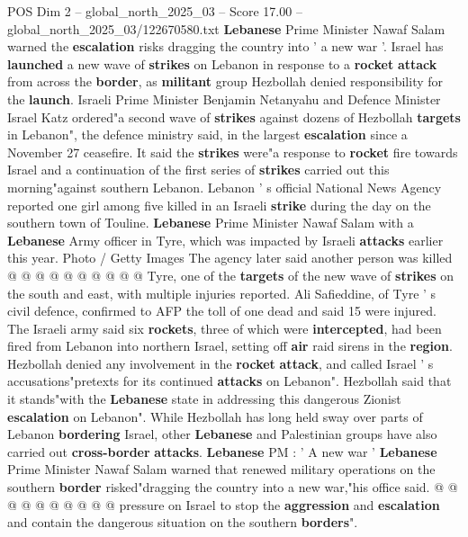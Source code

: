 \begin{textsample}{POS Dim 2 – global\_north\_2025\_03 – Score 17.00 – global\_north\_2025\_03/122670580.txt}  \label{ex:f2_pos_417}
\textbf{Lebanese} Prime Minister Nawaf Salam warned the \textbf{escalation} risks dragging the country into ' a new war '.
Israel has \textbf{launched} a new wave of \textbf{strikes} on Lebanon in response to a \textbf{rocket} \textbf{attack} from across the \textbf{border}, as \textbf{militant} group Hezbollah denied responsibility for the \textbf{launch}.
Israeli Prime Minister Benjamin Netanyahu and Defence Minister Israel Katz ordered"a second wave of \textbf{strikes} against dozens of Hezbollah \textbf{targets} in Lebanon", the defence ministry said, in the largest \textbf{escalation} since a November 27 ceasefire.
It said the \textbf{strikes} were"a response to \textbf{rocket} fire towards Israel and a continuation of the first series of \textbf{strikes} carried out this morning"against southern Lebanon.
Lebanon ' s official National News Agency reported one girl among five killed in an Israeli \textbf{strike} during the day on the southern town of Touline. \textbf{Lebanese} Prime Minister Nawaf Salam with a \textbf{Lebanese} Army officer in Tyre, which was impacted by Israeli \textbf{attacks} earlier this year.
Photo / Getty Images The agency later said another person was killed @ @ @ @ @ @ @ @ @ @ Tyre, one of the \textbf{targets} of the new wave of \textbf{strikes} on the south and east, with multiple injuries reported.
Ali Safieddine, of Tyre ' s civil defence, confirmed to AFP the toll of one dead and said 15 were injured.
The Israeli army said six \textbf{rockets}, three of which were \textbf{intercepted}, had been fired from Lebanon into northern Israel, setting off \textbf{air} raid sirens in the \textbf{region}.
Hezbollah denied any involvement in the \textbf{rocket} \textbf{attack}, and called Israel ' s accusations"pretexts for its continued \textbf{attacks} on Lebanon".
Hezbollah said that it stands"with the \textbf{Lebanese} state in addressing this dangerous Zionist \textbf{escalation} on Lebanon".
While Hezbollah has long held sway over parts of Lebanon \textbf{bordering} Israel, other \textbf{Lebanese} and Palestinian groups have also carried out \textbf{cross-border} \textbf{attacks}. \textbf{Lebanese} PM : ' A new war ' \textbf{Lebanese} Prime Minister Nawaf Salam warned that renewed military operations on the southern \textbf{border} risked"dragging the country into a new war,"his office said. @ @ @ @ @ @ @ @ @ @ pressure on Israel to stop the \textbf{aggression} and \textbf{escalation} and contain the dangerous situation on the southern \textbf{borders}".

\end{textsample}
